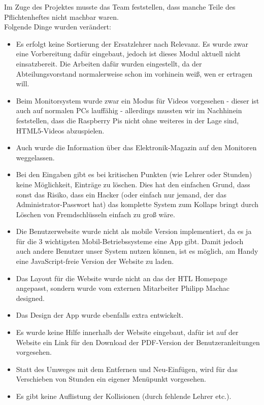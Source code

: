 Im Zuge des Projektes musste das Team feststellen, dass manche Teile des Pflichtenheftes nicht machbar waren.\\
Folgende Dinge wurden verändert:
\begin{itemize}
	\item Es erfolgt keine Sortierung der Ersatzlehrer nach Relevanz. Es wurde zwar eine Vorbereitung dafür eingebaut, jedoch ist dieses Modul aktuell nicht einsatzbereit. Die Arbeiten dafür wurden eingestellt, da der Abteilungsvorstand normalerweise schon im vorhinein weiß, wen er ertragen will.
	\item Beim Monitorsystem wurde zwar ein Modus für Videos vorgesehen - dieser ist auch auf normalen PCs lauffähig - allerdings mussten wir im Nachhinein feststellen, dass die Raspberry Pis nicht ohne weiteres in der Lage sind, HTML5-Videos abzuspielen.
	\item Auch wurde die Information über das Elektronik-Magazin auf den Monitoren weggelassen.
	\item Bei den Eingaben gibt es bei kritischen Punkten (wie Lehrer oder Stunden) keine Möglichkeit, Einträge zu löschen. Dies hat den einfachen Grund, dass sonst das Risiko, dass ein Hacker (oder einfach nur jemand, der das Administrator-Passwort hat) das komplette System zum Kollaps bringt durch Löschen von Fremdschlüsseln einfach zu groß wäre.
	\item Die Benutzerwebsite wurde nicht als mobile Version implementiert, da es ja für die 3 wichtigsten Mobil-Betriebssysteme eine App gibt. Damit jedoch auch andere Benutzer unser System nutzen können, ist es möglich, am Handy eine JavaScript-freie Version der Website zu laden.
	\item Das Layout für die Website wurde nicht an das der HTL Homepage angepasst, sondern wurde vom externen Mitarbeiter Philipp Machac designed.
	\item Das Design der App wurde ebenfalls extra entwickelt.
	\item Es wurde keine Hilfe innerhalb der Website eingebaut, dafür ist auf der Website ein Link für den Download der PDF-Version der Benutzeranleitungen vorgesehen.
	\item Statt des Umweges mit dem Entfernen und Neu-Einfügen, wird für das Verschieben von Stunden ein eigener Menüpunkt vorgesehen.
	\item Es gibt keine Auflistung der Kollisionen (durch fehlende Lehrer etc.).
\end{itemize}